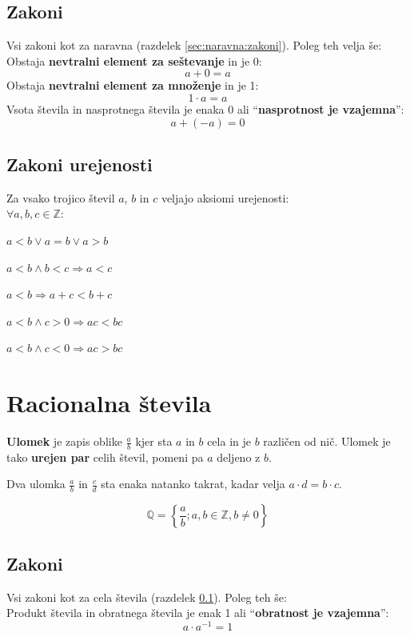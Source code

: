 \documentclass[a4paper,oneside,12pt,fleqn]{article}
\def\Z{\ensuremath{\mathbb Z}}
\def\Q{\ensuremath{\mathbb Q}}
\newcommand\krat\cdot
\renewcommand\implies\Rightarrow
\numberwithin{equation}{section}
\newenvironment{enumerate*}%
{
\vspace{-12pt}%
\begin{enumerate}%
\setlength{\itemsep}{0pt}%
\setlength{\parskip}{2pt}}%
{\end{enumerate}}
\begin{document}
\subsection{Zakoni}
\label{sec:cela:zakoni}
Vsi zakoni kot za naravna (razdelek \ref{sec:naravna:zakoni}). Poleg teh velja še: \\
Obstaja \textbf{nevtralni element za seštevanje} in je 0:
\[ a + 0 = a \]
Obstaja \textbf{nevtralni element za množenje} in je 1: 
\[ 1 \krat a = a \]
Vsota števila in nasprotnega števila je enaka 0 ali ``\textbf{nasprotnost je vzajemna}'': 
\[ a + (-a) = 0 \]

\subsection{Zakoni urejenosti}
\label{sec:cela:zakoniurejenosti}
Za vsako trojico števil $a$, $b$ in $c$ veljajo aksiomi urejenosti: \\
$\forall a, b, c \in \Z \!:$ 
\begin{enumerate*}
  \item $a < b \lor a = b \lor a > b$
  \item $a < b \land b < c \implies a < c$
  \item $a < b \implies a + c < b + c$
  \item $a < b \land c > 0 \implies ac < bc$
  \item $a < b \land c < 0 \implies ac > bc$
\end{enumerate*}

\section{Racionalna števila}
\label{sec:rac}
\textbf{Ulomek} je zapis oblike $\frac{a}{b}$ kjer sta $a$ in $b$ cela in je $b$ različen od nič. Ulomek je
tako \textbf{urejen par} celih števil, pomeni pa $a$ deljeno z $b$.

Dva ulomka $\frac{a}{b}$ in $\frac{c}{d}$ sta enaka natanko takrat, kadar velja $a \krat d = b \krat
c$.

\[ \Q = \left\{\frac{a}{b}; a,b \in \Z, b \neq 0 \right\} \]

\subsection{Zakoni}
Vsi zakoni kot za cela števila (razdelek \ref{sec:cela:zakoni}). Poleg teh še: \\
Produkt števila in obratnega števila je enak 1 ali ``\textbf{obratnost je vzajemna}'': 
\[ a \krat a^{-1} = 1 \]
\end{document}
